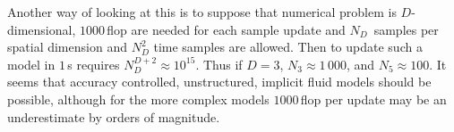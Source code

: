 Another way of looking at this is to suppose that numerical problem is $D$-dimensional, $1000$\,flop
are needed for each sample update
and $N_D$~samples per spatial dimension and $N_D^2$ time samples are allowed. Then to update
such a model in $1$\,s requires
$N_D^{D+2} \approx 10^{15}$. Thus  if $D=3$, $N_3 \approx 1\,000$, and $N_5 \approx 100$.
It seems that accuracy controlled, unstructured, implicit fluid models should be possible,
although for the more complex models $1000$\,flop per update may be an underestimate by
orders of magnitude.


